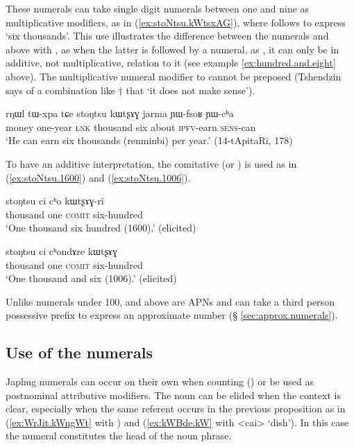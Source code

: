 These numerals can take single digit numerals between one and nine as multiplicative modifiers, as in (\ref{ex:stoNtsu.kWtsxAG}), where  follows   to express `six thousands'. This use illustrates the difference between the numerals  and above with , as when the latter is followed by a numeral, as , it can only be in additive, not multiplicative, relation to it (see example \ref{ex:hundred.and.eight} above). The multiplicative numeral modifier to  cannot be preposed (Tshendzin says of a combination like $\dagger$ that  `it does not make sense').

\begin{exe}
\ex  \label{ex:stoNtsu.kWtsxAG}
 \gll   rŋɯl tɯ-xpa tɕe stoŋtsu kɯtʂɤɣ jarma ɲɯ-fsoʁ ɲɯ-cʰa \\
 money one-year \textsc{lnk} thousand six about \textsc{ipfv}-earn \textsc{sens}-can \\
 \glt `He can earn six thousands (renminbi) per year.' (14-tApitaRi, 178)
 \end{exe}
 
 To have an additive interpretation, the comitative  (or ) is used as in (\ref{ex:stoNtsu.1600}) and (\ref{ex:stoNtsu.1006}).
 
  \begin{exe}
\ex  \label{ex:stoNtsu.1600}
 \gll  stoŋtsu ci cʰo kɯtʂɤɣ-ri \\
 thousand one \textsc{comit} six-hundred \\
 \glt `One thousand six hundred (1600).' (elicited)
  \end{exe}
  
    \begin{exe}
\ex  \label{ex:stoNtsu.1006}
 \gll  stoŋtsu ci cʰondɤre kɯtʂɤɣ \\
 thousand one \textsc{comit} six-hundred \\
 \glt `One thousand and six (1006).' (elicited)
  \end{exe}
 
Unlike numerals under 100,  and above are APNs and can take a third person possessive prefix  to express an approximate number (§ \ref{sec:approx.numerals}).
 
 \subsection{Use of the numerals}  \label{sec:uses.numerals}
 Japhug numerals can occur on their own when counting () or be used as postnominal attributive modifiers. The noun can be elided when the context is clear, especially when the same referent occurs in the previous proposition as in (\ref{ex:WrJit.kWngWt}  with ) and (\ref{ex:kWBde.kW} with <cai> `dish'). In this case the numeral constitutes the head of the noun phrase.

